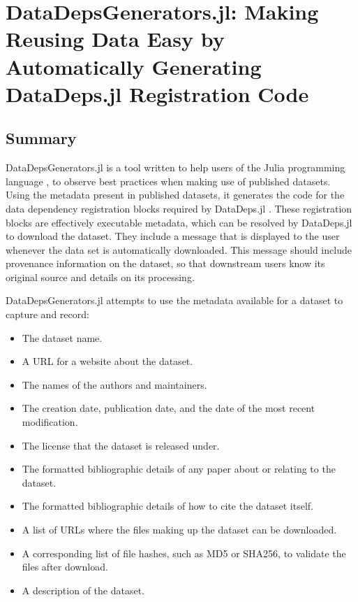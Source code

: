 \documentclass{book}
\begin{document}
\chapter{DataDepsGenerators.jl: Making Reusing Data Easy by Automatically Generating DataDeps.jl Registration Code}

\section{Summary}

DataDepsGenerators.jl is a tool written to help users of the Julia
programming language \citep{Julia}, to observe best practices when making
use of published datasets. Using the metadata present in published
datasets, it generates the code for the data dependency registration
blocks required by DataDeps.jl \citep{2018arXiv180801091W}. These
registration blocks are effectively executable metadata, which can be
resolved by DataDeps.jl to download the dataset. They include a message
that is displayed to the user whenever the data set is automatically
downloaded. This message should include provenance information on the
dataset, so that downstream users know its original source and details
on its processing.

DataDepsGenerators.jl attempts to use the metadata available for a
dataset to capture and record:

\begin{itemize}
	\item
	The dataset name.
	\item
	A URL for a website about the dataset.
	\item
	The names of the authors and maintainers.
	\item
	The creation date, publication date, and the date of the most recent
	modification.
	\item
	The license that the dataset is released under.
	\item
	The formatted bibliographic details of any paper about or relating to
	the dataset.
	\item
	The formatted bibliographic details of how to cite the dataset itself.
	\item
	A list of URLs where the files making up the dataset can be
	downloaded.
	\item
	A corresponding list of file hashes, such as MD5 or SHA256, to
	validate the files after download.
	\item
	A description of the dataset.
\end{itemize}
\end{document}

